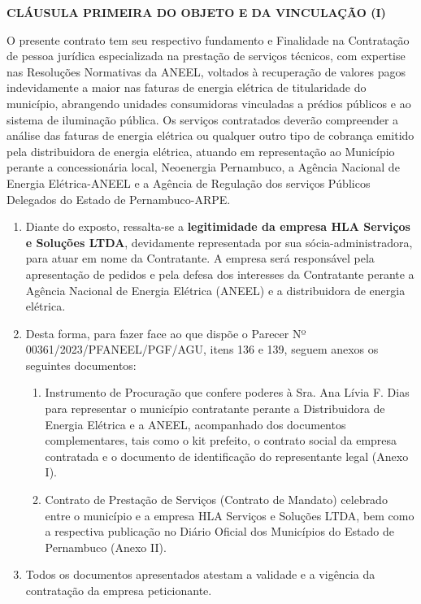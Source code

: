 \documentclass[11pt,a4paper]{article}
\begin{document}
\begin{list}{}{%
  \setlength{\leftmargin}{4cm}%
  \setlength{\rightmargin}{0cm}%
  \setlength{\topsep}{\baselineskip}%
  \setlength{\partopsep}{0pt}%
  \setlength{\parsep}{0pt}%
  \setlength{\itemsep}{0pt}%
}\item[]
{\fontsize{10}{12}\selectfont{}\selectfont
\textbf{CLÁUSULA PRIMEIRA DO OBJETO E DA VINCULAÇÃO (I)}

O presente contrato tem seu respectivo fundamento e Finalidade na Contratação de pessoa jurídica especializada na prestação de serviços técnicos, com expertise nas Resoluções Normativas da ANEEL, voltados à recuperação de valores pagos indevidamente a maior nas faturas de energia elétrica de titularidade do município, abrangendo unidades consumidoras vinculadas a prédios públicos e ao sistema de iluminação pública. Os serviços contratados deverão compreender a análise das faturas de energia elétrica ou qualquer outro tipo de cobrança emitido pela distribuidora de energia elétrica, atuando em representação ao Município perante a concessionária local, Neoenergia Pernambuco, a Agência Nacional de Energia Elétrica-ANEEL e a Agência de Regulação dos serviços Públicos Delegados do Estado de Pernambuco-ARPE.}
\end{list}

\begin{enumerate}[resume]
\item
  Diante do exposto, ressalta-se a \textbf{legitimidade da empresa HLA Serviços e Soluções LTDA}, devidamente representada por sua sócia-administradora, para atuar em nome da Contratante. A empresa será responsável pela apresentação de pedidos e pela defesa dos interesses da Contratante perante a Agência Nacional de Energia Elétrica (ANEEL) e a distribuidora de energia elétrica.
\item
  Desta forma, para fazer face ao que dispõe o Parecer Nº 00361/2023/PFANEEL/PGF/AGU, itens 136 e 139, seguem anexos os seguintes documentos:

  \begin{enumerate}
  \item
   Instrumento de Procuração que confere poderes à Sra. Ana Lívia F. Dias para representar o município contratante perante a Distribuidora de Energia Elétrica e a ANEEL, acompanhado dos documentos complementares, tais como o kit prefeito, o contrato social da empresa contratada e o documento de identificação do representante legal (Anexo I).
  \item
    Contrato de Prestação de Serviços (Contrato de Mandato) celebrado entre o município e a empresa HLA Serviços e Soluções LTDA, bem como a respectiva publicação no Diário Oficial dos Municípios do Estado de Pernambuco (Anexo II).  
  \end{enumerate}
\item
  Todos os documentos apresentados atestam a validade e a vigência da contratação da empresa peticionante.
\end{enumerate}
\end{document}
